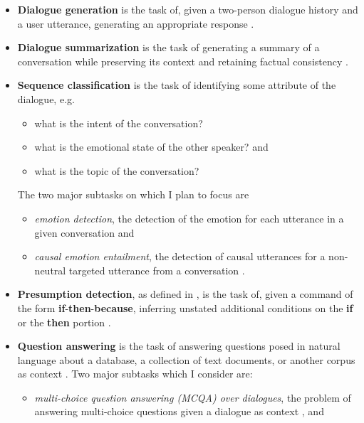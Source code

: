 \documentclass[12pt]{report}
\begin{document}
\begin{itemize}[nolistsep]
    \item
        \textbf{Dialogue generation} is the task of, given a two-person dialogue history and a user utterance, generating an appropriate response \cite{Li2016-ef}.
    \item 
        \textbf{Dialogue summarization} is the task of generating a summary of a conversation while preserving its context \cite{Kim2022-pz} and retaining factual consistency \cite{Richardson2023-mq}.
    \item 
        \textbf{Sequence classification} is the task of identifying some attribute of the dialogue, e.g.
        \begin{itemize}[nolistsep]
            \item what is the intent of the conversation?
            \item what is the emotional state of the other speaker? and
            \item what is the topic of the conversation?
        \end{itemize}
        The two major subtasks on which I plan to focus are
        \begin{itemize}[nolistsep]
            \item \textit{emotion detection}, the detection of the emotion for each utterance in a given conversation \cite{Yi2022-tv} and
            \item \textit{causal emotion entailment}, the detection of causal utterances for a non-neutral targeted utterance from a conversation \cite{Li2022-jr}.
        \end{itemize}
    \item
        \textbf{Presumption detection}, as defined in \cite{Arabshahi2021-oz}, is the task of, given a command of the form \textbf{if}-\textbf{then}-\textbf{because}, inferring unstated additional conditions on the \textbf{if} or the \textbf{then} portion \cite{Arabshahi2021-oz}.
    \item
        \textbf{Question answering} is the task of answering questions posed in natural language about a database, a collection of text documents, or another corpus as context \cite{Calijorne_Soares2020-eo}.
        Two major subtasks which I consider are:
        \begin{itemize}[nolistsep]
            \item \textit{multi-choice question answering (MCQA) over dialogues}, the problem of answering multi-choice questions given a dialogue as context \cite{Richardson2023-mq}, and

\end{itemize}
\end{itemize}
\end{document}
